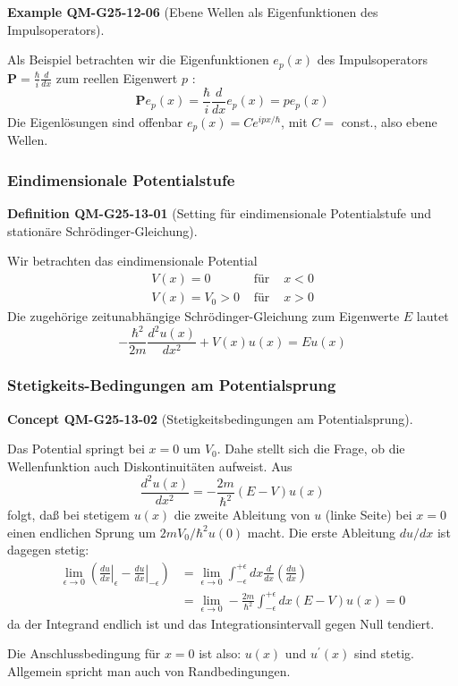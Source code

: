 \documentclass[10pt, letterpaper]{article}
\newcommand{\CustomHeading}[3]{%
  \par\medskip\noindent%
  \textbf{#1 #2} \textnormal{(#3)}.\enskip%
}
\newenvironment{DEF}[2]{\begin{unitbox}\CustomHeading{Definition}{#1}{#2}}{\end{unitbox}}
\newenvironment{EXA}[2]{\begin{unitbox}\CustomHeading{Example}{#1}{#2}}{\end{unitbox}}
\newenvironment{CONC}[2]{\begin{unitbox}\CustomHeading{Concept}{#1}{#2}}{\end{unitbox}}
\begin{document}
\begin{EXA}{QM-G25-12-06}{Ebene Wellen als Eigenfunktionen des Impulsoperators}
Als Beispiel betrachten wir die Eigenfunktionen $e_{p}(x)$ des Impulsoperators $\mathbf{P}=\frac{\hbar}{i} \frac{d}{d x}$ zum reellen Eigenwert $p$ :
$$
\mathbf{P} e_{p}(x)=\frac{\hbar}{i} \frac{d}{d x} e_{p}(x)=p e_{p}(x)
$$
Die Eigenlösungen sind offenbar $e_{p}(x)=C e^{i p x / \hbar}$, mit $C=$ const., also ebene Wellen.
\end{EXA}



\subsubsection{Eindimensionale Potentialstufe}


\begin{DEF}{QM-G25-13-01}{Setting für eindimensionale Potentialstufe und stationäre Schrödinger-Gleichung}
Wir betrachten das eindimensionale Potential
$$
\begin{array}{rlll}
V(x)=0 & \text { für } & x<0 \\
V(x)=V_{0}>0 & \text { für } & x>0
\end{array}
$$
Die zugehörige zeitunabhängige Schrödinger-Gleichung zum Eigenwerte $E$ lautet
$$
-\frac{\hbar^{2}}{2 m} \frac{d^{2} u(x)}{d x^{2}}+V(x) u(x)=E u(x)
$$
\end{DEF}


\subsubsection*{Stetigkeits-Bedingungen am Potentialsprung}


\begin{CONC}{QM-G25-13-02}{Stetigkeitsbedingungen am Potentialsprung}
Das Potential springt bei $x=0$ um $V_{0}$. Dahe stellt sich die Frage, ob die Wellenfunktion auch Diskontinuitäten aufweist. Aus
$$
\frac{d^{2} u(x)}{d x^{2}}=-\frac{2 m}{\hbar^{2}}(E-V) u(x)
$$
folgt, daß bei stetigem $u(x)$ die zweite Ableitung von $u$ (linke Seite) bei $x=0$ einen endlichen Sprung um $2 m V_{0} / \hbar^{2} u(0)$ macht.
Die erste Ableitung $d u / d x$ ist dagegen stetig:
$$
\begin{aligned}
\lim _{\epsilon \rightarrow 0}\left(\left.\frac{d u}{d x}\right|_{\epsilon}-\left.\frac{d u}{d x}\right|_{-\epsilon}\right) & =\lim _{\epsilon \rightarrow 0} \int_{-\epsilon}^{+\epsilon} d x \frac{d}{d x}\left(\frac{d u}{d x}\right) \\
& =\lim _{\epsilon \rightarrow 0}-\frac{2 m}{\hbar^{2}} \int_{-\epsilon}^{+\epsilon} d x(E-V) u(x)=0
\end{aligned}
$$
da der Integrand endlich ist und das Integrationsintervall gegen Null tendiert.

Die Anschlussbedingung für $x=0$ ist also: $u(x)$ und $u^{\prime}(x)$ sind stetig. Allgemein spricht man auch von Randbedingungen.
\end{CONC}
\end{document}
